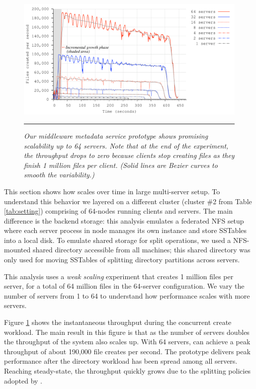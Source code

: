 \begin{figure}[t]
\centerline{\includegraphics[scale=0.55]{./figs/ldb_insertrate}}
\vspace{10pt}
\caption{\textit{\footnotesize 
Our middleware metadata service prototype shows promising scalability
up to 64 servers.
Note that at the end of the experiment,
the throughput drops to zero
because clients stop creating files as they finish 1 million files per client.
(Solid lines are Bezier curves to smooth the variability.)
}
}
\hrule
\label{graph:ldb-scaling}
\end{figure}

This section shows how \sys scales over time in large multi-server setup. To
understand this behavior we layered \sys on a different cluster (cluster \#2
from Table \ref{tab:setting}) comprising of 64-nodes running \sys clients and
servers. The main difference is the backend storage: this analysis emulates a
federated NFS setup where each \psys server process in node manages its own \tfs 
instance and store SSTables into a local disk.
To emulate shared storage for split operations, we used a NFS-mounted shared 
directory accessible from all machines; this shared directory was only used for 
moving SSTables of splitting directory partitions across servers.

This analysis uses a \textit{weak scaling} experiment that creates
1 million files per server, for a total of 64 million files in the
64-server configuration. We vary the number of servers from 1 to 64
to understand how performance scales with more servers.

Figure \ref{graph:ldb-scaling} shows the instantaneous throughput
during the concurrent create workload.
The main result in this figure is that as the number of servers doubles the
throughput of the system also scales up. With 64 servers, \giga can achieve a
peak throughput of about 190,000 file creates per second.
The prototype delivers peak performance after the directory workload
has been spread among all servers.
Reaching steady-state, the throughput quickly grows
due to the splitting policies adopted by \giga.


